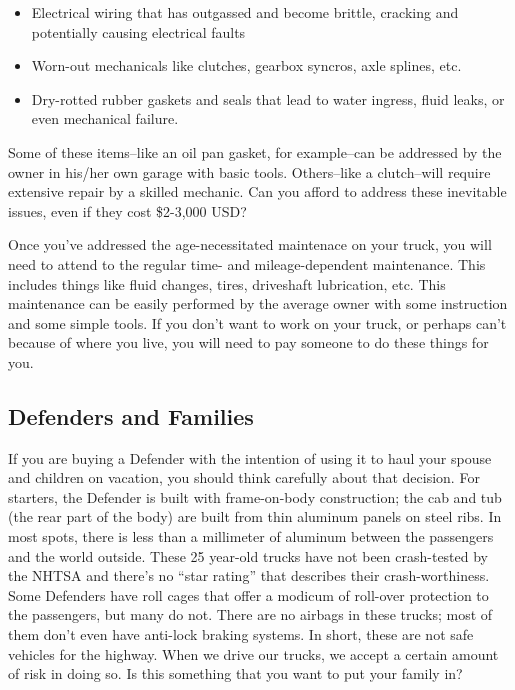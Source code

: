 \documentclass{article}
\begin{document}
\begin{itemize}
 \item Electrical wiring that has outgassed and become brittle, cracking and potentially causing electrical faults
 \item Worn-out mechanicals like clutches, gearbox syncros, axle splines, etc.
 \item Dry-rotted rubber gaskets and seals that lead to water ingress, fluid leaks, or even mechanical failure.
\end{itemize}

Some of these items--like an oil pan gasket, for example--can be addressed by the owner in his/her own garage with basic tools.   Others--like a clutch--will require extensive repair by a skilled mechanic.  Can you afford to address these inevitable issues, even if they cost \$2-3,000 USD?

Once you've addressed the age-necessitated maintenace on your truck, you will need to attend to the regular time- and mileage-dependent maintenance.  This includes things like fluid changes, tires, driveshaft lubrication, etc.  This maintenance can be easily performed by the average owner with some instruction and some simple tools.  If you don't want to work on your truck, or perhaps can't because of where you live, you will need to pay someone to do these things for you.

\subsection{Defenders and Families}
If you are buying a Defender with the intention of using it to haul your spouse and children on vacation, you should think carefully about that decision.  For starters, the Defender is built with frame-on-body construction; the cab and tub (the rear part of the body) are built from thin aluminum panels on  steel ribs.   In most spots, there is less than a millimeter of aluminum between the passengers and the world outside.  These 25 year-old trucks have not been crash-tested by the NHTSA and there's no ``star rating'' that describes their crash-worthiness.  Some Defenders have roll cages that offer a modicum of roll-over protection to the passengers, but many do not.   There are no airbags in these trucks; most of them don't even have anti-lock braking systems.  In short, these are not safe vehicles for the highway.  When we drive our trucks, we accept a certain amount of risk in doing so.  Is this something that you want to put your family in?
\end{document}
